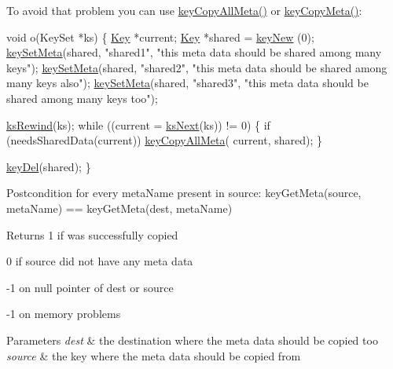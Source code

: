 To avoid that problem you can use \hyperlink{group__keymeta_ga8e63720a65610a29597494d0671f9401}{key\-Copy\-All\-Meta()} or \hyperlink{group__keymeta_ga9a22b992478e613c8788bd460b4a1f0c}{key\-Copy\-Meta()}\-:


\begin{DoxyCodeInclude}
\textcolor{keywordtype}{void} o(KeySet *ks)
\{
        \hyperlink{classkdb_1_1Key_a5679f5cae63caddd64a60388b9cc77fa}{Key} *current;
        \hyperlink{classkdb_1_1Key_a5679f5cae63caddd64a60388b9cc77fa}{Key} *shared = \hyperlink{group__key_gad23c65b44bf48d773759e1f9a4d43b89}{keyNew} (0);
        \hyperlink{group__keymeta_gae1f15546b234ffb6007d8a31178652b9}{keySetMeta}(shared, \textcolor{stringliteral}{"shared1"}, \textcolor{stringliteral}{"this meta data should be
       shared among many keys"});
        \hyperlink{group__keymeta_gae1f15546b234ffb6007d8a31178652b9}{keySetMeta}(shared, \textcolor{stringliteral}{"shared2"}, \textcolor{stringliteral}{"this meta data should be
       shared among many keys also"});
        \hyperlink{group__keymeta_gae1f15546b234ffb6007d8a31178652b9}{keySetMeta}(shared, \textcolor{stringliteral}{"shared3"}, \textcolor{stringliteral}{"this meta data should be
       shared among many keys too"});

        \hyperlink{group__keyset_gabe793ff51f1728e3429c84a8a9086b70}{ksRewind}(ks);
        \textcolor{keywordflow}{while} ((current = \hyperlink{group__keyset_ga317321c9065b5a4b3e33fe1c399bcec9}{ksNext}(ks)) != 0)
        \{
                \textcolor{keywordflow}{if} (needsSharedData(current)) \hyperlink{group__keymeta_ga8e63720a65610a29597494d0671f9401}{keyCopyAllMeta}(
      current, shared);
        \}

        \hyperlink{group__key_ga3df95bbc2494e3e6703ece5639be5bb1}{keyDel}(shared);
\}
\end{DoxyCodeInclude}
 \begin{DoxyPostcond}{Postcondition}
for every meta\-Name present in source\-: key\-Get\-Meta(source, meta\-Name) == key\-Get\-Meta(dest, meta\-Name)
\end{DoxyPostcond}
\begin{DoxyReturn}{Returns}
1 if was successfully copied 

0 if source did not have any meta data 

-\/1 on null pointer of dest or source 

-\/1 on memory problems 
\end{DoxyReturn}

\begin{DoxyParams}{Parameters}
{\em dest} & the destination where the meta data should be copied too \\
\hline
{\em source} & the key where the meta data should be copied from \\
\hline
\end{DoxyParams}


